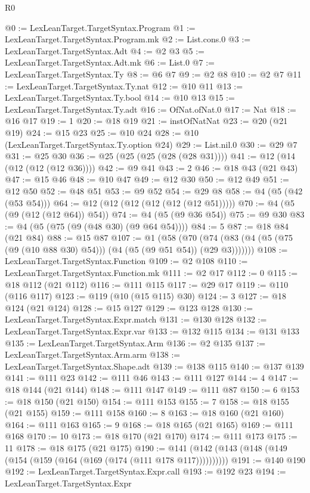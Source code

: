 \begin{lexlean}{R0}
\begin{coremodule}
@0 := LexLeanTarget.TargetSyntax.Program
@1 := LexLeanTarget.TargetSyntax.Program.mk
@2 := List.cons.{0}
@3 := LexLeanTarget.TargetSyntax.Adt
@4 := @2 @3
@5 := LexLeanTarget.TargetSyntax.Adt.mk
@6 := List.{0}
@7 := LexLeanTarget.TargetSyntax.Ty
@8 := @6 @7
@9 := @2 @8
@10 := @2 @7
@11 := LexLeanTarget.TargetSyntax.Ty.nat
@12 := @10 @11
@13 := LexLeanTarget.TargetSyntax.Ty.bool
@14 := @10 @13
@15 := LexLeanTarget.TargetSyntax.Ty.adt
@16 := OfNat.ofNat.{0}
@17 := Nat
@18 := @16 @17
@19 := 1
@20 := @18 @19
@21 := instOfNatNat
@23 := @20 (@21 @19)
@24 := @15 @23
@25 := @10 @24
@28 := @10 (LexLeanTarget.TargetSyntax.Ty.option @24)
@29 := List.nil.{0}
@30 := @29 @7
@31 := @25 @30
@36 := @25 (@25 (@25 (@28 (@28 @31))))
@41 := @12 (@14 (@12 (@12 (@12 @36))))
@42 := @9 @41
@43 := 2
@46 := @18 @43 (@21 @43)
@47 := @15 @46
@48 := @10 @47
@49 := @12 @30
@50 := @12 @49
@51 := @12 @50
@52 := @48 @51
@53 := @9 @52
@54 := @29 @8
@58 := @4 (@5 (@42 (@53 @54)))
@64 := @12 (@12 (@12 (@12 (@12 (@12 @51)))))
@70 := @4 (@5 (@9 (@12 (@12 @64)) @54))
@74 := @4 (@5 (@9 @36 @54))
@75 := @9 @30
@83 := @4 (@5 (@75 (@9 (@48 @30) (@9 @64 @54))))
@84 := 5
@87 := @18 @84 (@21 @84)
@88 := @15 @87
@107 := @1
    (@58 (@70 (@74 (@83 (@4 (@5 (@75 (@9 (@10 @88 @30) @54))) (@4 (@5 (@9 @51 @54)) (@29 @3)))))))
@108 := LexLeanTarget.TargetSyntax.Function
@109 := @2 @108
@110 := LexLeanTarget.TargetSyntax.Function.mk
@111 := @2 @17
@112 := 0
@115 := @18 @112 (@21 @112)
@116 := @111 @115
@117 := @29 @17
@119 := @110 (@116 @117)
@123 := @119 (@10 (@15 @115) @30)
@124 := 3
@127 := @18 @124 (@21 @124)
@128 := @15 @127
@129 := @123 @128
@130 := LexLeanTarget.TargetSyntax.Expr.match
@131 := @130 @128
@132 := LexLeanTarget.TargetSyntax.Expr.var
@133 := @132 @115
@134 := @131 @133
@135 := LexLeanTarget.TargetSyntax.Arm
@136 := @2 @135
@137 := LexLeanTarget.TargetSyntax.Arm.arm
@138 := LexLeanTarget.TargetSyntax.Shape.adt
@139 := @138 @115
@140 := @137 @139
@141 := @111 @23
@142 := @111 @46
@143 := @111 @127
@144 := 4
@147 := @18 @144 (@21 @144)
@148 := @111 @147
@149 := @111 @87
@150 := 6
@153 := @18 @150 (@21 @150)
@154 := @111 @153
@155 := 7
@158 := @18 @155 (@21 @155)
@159 := @111 @158
@160 := 8
@163 := @18 @160 (@21 @160)
@164 := @111 @163
@165 := 9
@168 := @18 @165 (@21 @165)
@169 := @111 @168
@170 := 10
@173 := @18 @170 (@21 @170)
@174 := @111 @173
@175 := 11
@178 := @18 @175 (@21 @175)
@190 := @141 (@142 (@143 (@148 (@149 (@154 (@159 (@164 (@169 (@174 (@111 @178 @117))))))))))
@191 := @140 @190
@192 := LexLeanTarget.TargetSyntax.Expr.call
@193 := @192 @23
@194 := LexLeanTarget.TargetSyntax.Expr

\end{coremodule}
\end{lexlean}
